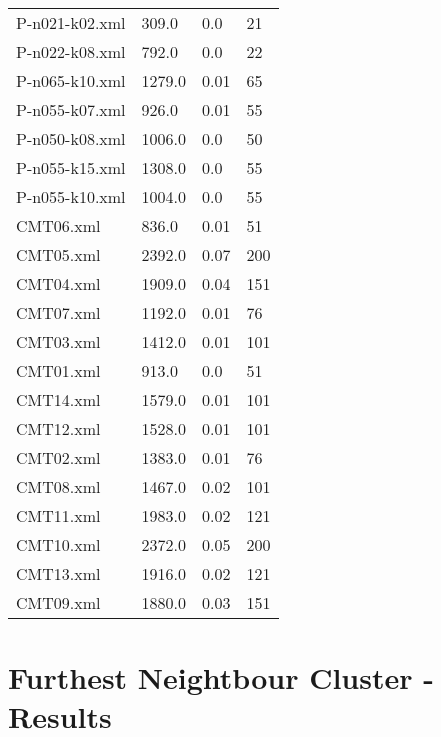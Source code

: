\documentclass[12pt]{article}
\begin{document}
\begin{appendices}
\begin{table}[]
\begin{tabular}{llll}
	P-n021-k02.xml & 309.0 & 0.0 & 21 \\
	P-n022-k08.xml & 792.0 & 0.0 & 22 \\
	P-n065-k10.xml & 1279.0 & 0.01 & 65 \\
	P-n055-k07.xml & 926.0 & 0.01 & 55 \\
	P-n050-k08.xml & 1006.0 & 0.0 & 50 \\
	P-n055-k15.xml & 1308.0 & 0.0 & 55 \\
	P-n055-k10.xml & 1004.0 & 0.0 & 55 \\
	CMT06.xml & 836.0 & 0.01 & 51 \\
	CMT05.xml & 2392.0 & 0.07 & 200 \\
	CMT04.xml & 1909.0 & 0.04 & 151 \\
	CMT07.xml & 1192.0 & 0.01 & 76 \\
	CMT03.xml & 1412.0 & 0.01 & 101 \\
	CMT01.xml & 913.0 & 0.0 & 51 \\
	CMT14.xml & 1579.0 & 0.01 & 101 \\
	CMT12.xml & 1528.0 & 0.01 & 101 \\
	CMT02.xml & 1383.0 & 0.01 & 76 \\
	CMT08.xml & 1467.0 & 0.02 & 101 \\
	CMT11.xml & 1983.0 & 0.02 & 121 \\
	CMT10.xml & 2372.0 & 0.05 & 200 \\
	CMT13.xml & 1916.0 & 0.02 & 121 \\
	CMT09.xml & 1880.0 & 0.03 & 151
	\end{tabular}
	\end{table}
\newpage

\section{Furthest Neightbour Cluster - Results}


\end{appendices}
\end{document}
